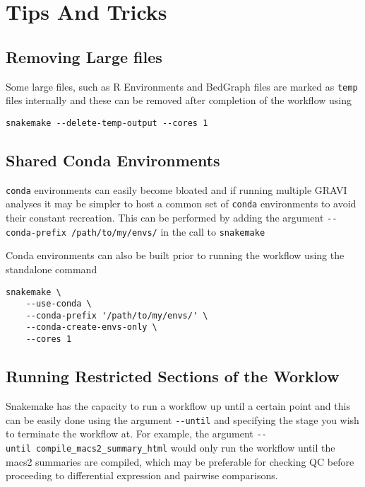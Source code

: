 \documentclass[
]{book}
\begin{document}
\hypertarget{tips-and-tricks}{%
\section{Tips And Tricks}\label{tips-and-tricks}}

\hypertarget{removing-large-files}{%
\subsection{Removing Large files}\label{removing-large-files}}

Some large files, such as R Environments and BedGraph files are marked as \texttt{temp} files internally and these can be removed after completion of the workflow using

\begin{verbatim}
snakemake --delete-temp-output --cores 1
\end{verbatim}

\hypertarget{shared-conda-environments}{%
\subsection{Shared Conda Environments}\label{shared-conda-environments}}

\texttt{conda} environments can easily become bloated and if running multiple GRAVI analyses it may be simpler to host a common set of \texttt{conda} environments to avoid their constant recreation.
This can be performed by adding the argument \texttt{-\/-conda-prefix\ \textquotesingle{}/path/to/my/envs/\textquotesingle{}} in the call to \texttt{snakemake}

Conda environments can also be built prior to running the workflow using the standalone command

\begin{verbatim}
snakemake \
    --use-conda \
    --conda-prefix '/path/to/my/envs/' \
    --conda-create-envs-only \
    --cores 1
\end{verbatim}

\hypertarget{running-restricted-sections-of-the-worklow}{%
\subsection{Running Restricted Sections of the Worklow}\label{running-restricted-sections-of-the-worklow}}

Snakemake has the capacity to run a workflow up until a certain point and this can be easily done using the argument \texttt{-\/-until} and specifying the stage you wish to terminate the workflow at. For example, the argument \texttt{-\/-until\ compile\_macs2\_summary\_html} would only run the workflow until the macs2 summaries are compiled, which may be preferable for checking QC before proceeding to differential expression and pairwise comparisons.
\end{document}
